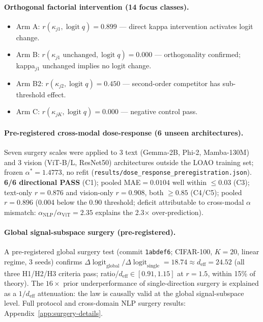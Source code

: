 \documentclass{article}
\DeclareMathOperator{\logit}{logit}
\begin{document}
\paragraph{Orthogonal factorial intervention (14 focus classes).}
\begin{itemize}
\item Arm A: $r(\kappa_{j1}, \logit q)=0.899$ --- direct kappa intervention activates logit change.
\item Arm B: $r(\kappa_{j1}\text{ unchanged}, \logit q)=0.000$ --- orthogonality confirmed; kappa$_{j1}$ unchanged implies no logit change.
\item Arm B2: $r(\kappa_{j2}, \logit q)=0.450$ --- second-order competitor has sub-threshold effect.
\item Arm C: $r(\kappa_{jK}, \logit q)=0.000$ --- negative control pass.
\end{itemize}

\paragraph{Pre-registered cross-modal dose-response (6 unseen architectures).}
Seven surgery scales were applied to 3 text (Gemma-2B, Phi-2, Mamba-130M) and 3 vision (ViT-B/L, ResNet50) architectures outside the LOAO training set; frozen $\alpha^*=1.4773$, no refit (\texttt{results/dose\_response\_preregistration.json}).
\textbf{6/6 directional PASS} (C1); pooled MAE$=0.0104$ well within $\leq0.03$ (C3); text-only $r=0.876$ and vision-only $r=0.908$, both $\geq0.85$ (C4/C5); pooled $r=0.896$ (0.004 below the 0.90 threshold; deficit attributable to cross-modal $\alpha$ mismatch: $\alpha_\mathrm{NLP}/\alpha_\mathrm{ViT}=2.35$ explains the 2.3$\times$ over-prediction).

\paragraph{Global signal-subspace surgery (pre-registered).}
A pre-registered global surgery test (commit \texttt{1abdef6}; CIFAR-100, $K=20$, linear regime,
3 seeds) confirms $\Delta\logit_{\mathrm{global}}/\Delta\logit_{\mathrm{single}} = 18.74 \approx d_{\mathrm{eff}} = 24.52$ (all three H1/H2/H3 criteria pass; ratio/$d_\mathrm{eff}\in[0.91,1.15]$ at $r=1.5$, within 15\% of theory).
The $16\times$ prior underperformance of single-direction surgery is explained as a $1/d_\mathrm{eff}$ attenuation: the law is causally valid at the global signal-subspace level.
Full protocol and cross-domain NLP surgery results: Appendix~\ref{app:surgery-details}.
\end{document}
